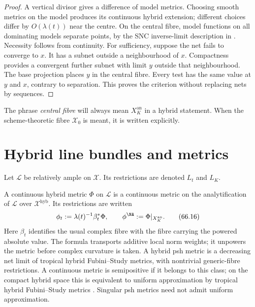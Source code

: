 \begin{proof}
A vertical divisor gives a difference of model metrics. Choosing smooth
metrics on the model produces its continuous hybrid extension; different
choices differ by $O(\lambda(t))$ near the centre. On the central fibre,
model functions on all dominating models separate points, by the SNC
inverse-limit description in \cite[Section~4.4]{BJ17Hybrid}.
Necessity follows from continuity. For sufficiency, suppose the net fails
to converge to $x$. It has a subnet outside a neighbourhood of $x$.
Compactness provides a convergent further subnet with limit $y$ outside
that neighbourhood. The base projection places $y$ in the central fibre.
Every test has the same value at $y$ and $x$, contrary to separation.
This proves the criterion without replacing nets by sequences.
\end{proof}

\begin{remark}
\label{rem:hybrid-central-fibre}
The phrase \emph{central fibre} will always mean $X_K^{\mathrm{an}}$ in a hybrid statement. When the scheme-theoretic fibre $\mathcal X_0$ is meant, it is written explicitly.
\end{remark}

\section{Hybrid line bundles and metrics}
\label{sec:hybrid-metrics}

Let $\mathcal L$ be relatively ample on $\mathcal X$.
Its restrictions are denoted $L_t$ and $L_K$.

\begin{definition}
\label{def:hybrid-metric}
A continuous hybrid metric $\Phi$ on $\mathcal L$ is a continuous metric on the analytification of $\mathcal L$ over $\mathcal X^{\mathrm{hyb}}$. Its restrictions are written
\[
                   \phi_t:=\lambda(t)^{-1}\beta_t^*\Phi,
        \qquad
                   \phi^{\NA}:=\Phi|_{X_K^{\mathrm{an}}}.
\tag{66.16}\label{eq:hybrid-metric-restrictions}
\]
Here $\beta_t$ identifies the usual complex fibre with the fibre carrying the powered absolute value. The formula transports additive local norm weights; it unpowers the metric before complex curvature is taken. A hybrid psh metric is a decreasing net limit of tropical hybrid Fubini--Study metrics, with nontrivial generic-fibre restrictions. A continuous metric is semipositive if it belongs to this class; on the compact hybrid space this is equivalent to uniform approximation by tropical hybrid Fubini--Study metrics \cite[Definitions~2.18--2.19, Proposition~2.21]{PS23Hybrid}. Singular psh metrics need not admit uniform approximation.
\end{definition}

